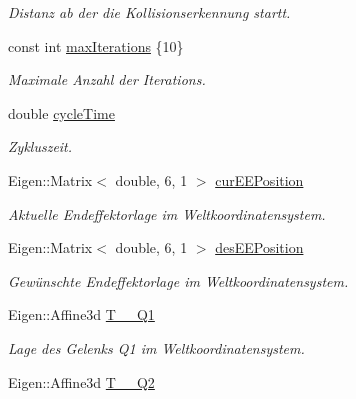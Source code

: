 \begin{DoxyCompactItemize}
\begin{DoxyCompactList}\small\item\em Distanz ab der die Kollisionserkennung startt. \end{DoxyCompactList}\item 
\hypertarget{classNumericKinematic_ac07694cf3b68d0392d9d5045af85d92f}{const int \hyperlink{classNumericKinematic_ac07694cf3b68d0392d9d5045af85d92f}{max\-Iterations} \{10\}}\label{classNumericKinematic_ac07694cf3b68d0392d9d5045af85d92f}

\begin{DoxyCompactList}\small\item\em Maximale Anzahl der Iterations. \end{DoxyCompactList}\item 
\hypertarget{classNumericKinematic_aa96fd840d44735dcf5af2a6007cdd9a5}{double \hyperlink{classNumericKinematic_aa96fd840d44735dcf5af2a6007cdd9a5}{cycle\-Time}}\label{classNumericKinematic_aa96fd840d44735dcf5af2a6007cdd9a5}

\begin{DoxyCompactList}\small\item\em Zykluszeit. \end{DoxyCompactList}\item 
\hypertarget{classNumericKinematic_a92de01f45510f0c7d5c1d8872740efb8}{Eigen\-::\-Matrix$<$ double, 6, 1 $>$ \hyperlink{classNumericKinematic_a92de01f45510f0c7d5c1d8872740efb8}{cur\-E\-E\-Position}}\label{classNumericKinematic_a92de01f45510f0c7d5c1d8872740efb8}

\begin{DoxyCompactList}\small\item\em Aktuelle Endeffektorlage im Weltkoordinatensystem. \end{DoxyCompactList}\item 
\hypertarget{classNumericKinematic_ab77311c858600ae931ce1e34d95a1d6b}{Eigen\-::\-Matrix$<$ double, 6, 1 $>$ \hyperlink{classNumericKinematic_ab77311c858600ae931ce1e34d95a1d6b}{des\-E\-E\-Position}}\label{classNumericKinematic_ab77311c858600ae931ce1e34d95a1d6b}

\begin{DoxyCompactList}\small\item\em Gewünschte Endeffektorlage im Weltkoordinatensystem. \end{DoxyCompactList}\item 
Eigen\-::\-Affine3d \hyperlink{classNumericKinematic_a2b3815e7cce36ab203257bf8f5e2e236}{T\-\_\-\_\-\-Q1}
\begin{DoxyCompactList}\small\item\em Lage des Gelenks Q1 im Weltkoordinatensystem. \end{DoxyCompactList}\item 
\hypertarget{classNumericKinematic_aa77f38a33ab7d209446df174a9ba61dc}{Eigen\-::\-Affine3d \hyperlink{classNumericKinematic_aa77f38a33ab7d209446df174a9ba61dc}{T\-\_\-\_\-\-Q2}}\label{classNumericKinematic_aa77f38a33ab7d209446df174a9ba61dc}


\end{DoxyCompactItemize}
